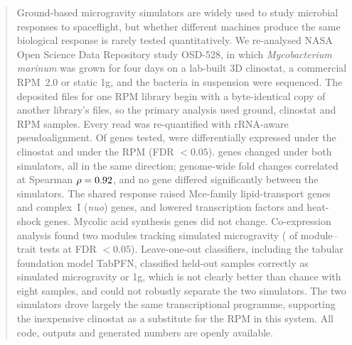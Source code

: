 \begin{abstract}
Ground-based microgravity simulators are widely used to study microbial responses to spaceflight, but whether different machines produce the same biological response is rarely tested quantitatively. We re-analysed NASA Open Science Data Repository study OSD-528, in which \textit{Mycobacterium marinum} was grown for four days on a lab-built 3D clinostat, a commercial RPM~2.0 or static 1g, and the bacteria in suspension were sequenced. The deposited files for one RPM library begin with a byte-identical copy of another library's files, so the primary analysis used \nGround{} ground, \nClino{} clinostat and \nRpm{} RPM samples. Every read was re-quantified with rRNA-aware pseudoalignment. Of \nGenesTested{} genes tested, \nDegClino{} were differentially expressed under the clinostat and \nDegRpm{} under the RPM (FDR $<0.05$). \nDegShared{} genes changed under both simulators, all in the same direction; genome-wide fold changes correlated at Spearman $\rho=\rhoSimulators$, and no gene differed significantly between the simulators. The shared response raised Mce-family lipid-transport genes and complex~I (\textit{nuo}) genes, and lowered transcription factors and heat-shock genes. Mycolic acid synthesis genes did not change. Co-expression analysis found two modules tracking simulated microgravity (\nModuleTraitSig{} of \nModuleTraitTests{} module--trait tests at FDR $<0.05$). Leave-one-out classifiers, including the tabular foundation model TabPFN, classified \mlBinTabpfnFiftyCorrect{} held-out samples correctly as simulated microgravity or 1g, which is not clearly better than chance with eight samples, and could not robustly separate the two simulators. The two simulators drove largely the same transcriptional programme, supporting the inexpensive clinostat as a substitute for the RPM in this system. All code, outputs and generated numbers are openly available.
\end{abstract}
